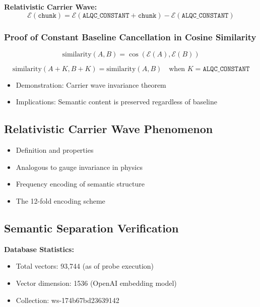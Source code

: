 \textbf{Relativistic Carrier Wave:}
\begin{equation}
    \mathcal{E}(\texttt{chunk}) = \mathcal{E}(\texttt{ALQC\_CONSTANT} + \texttt{chunk}) - \mathcal{E}(\texttt{ALQC\_CONSTANT})
\end{equation}

\subsubsection{Proof of Constant Baseline Cancellation in Cosine Similarity}
\begin{equation}
    \text{similarity}(A, B) = \cos(\mathcal{E}(A), \mathcal{E}(B))
\end{equation}

\begin{equation}
    \text{similarity}(A + K, B + K) = \text{similarity}(A, B) \quad \text{when } K = \texttt{ALQC\_CONSTANT}
\end{equation}

\begin{itemize}
    \item Demonstration: Carrier wave invariance theorem
    \item Implications: Semantic content is preserved regardless of baseline
\end{itemize}

\subsection{Relativistic Carrier Wave Phenomenon}
\begin{itemize}
    \item Definition and properties
    \item Analogous to gauge invariance in physics
    \item Frequency encoding of semantic structure
    \item The 12-fold encoding scheme
\end{itemize}

\subsection{Semantic Separation Verification}

\textbf{Database Statistics:}
\begin{itemize}
    \item Total vectors: 93,744 (as of probe execution)
    \item Vector dimension: 1536 (OpenAI embedding model)
    \item Collection: ws-174b67bd23639142
\end{itemize}

